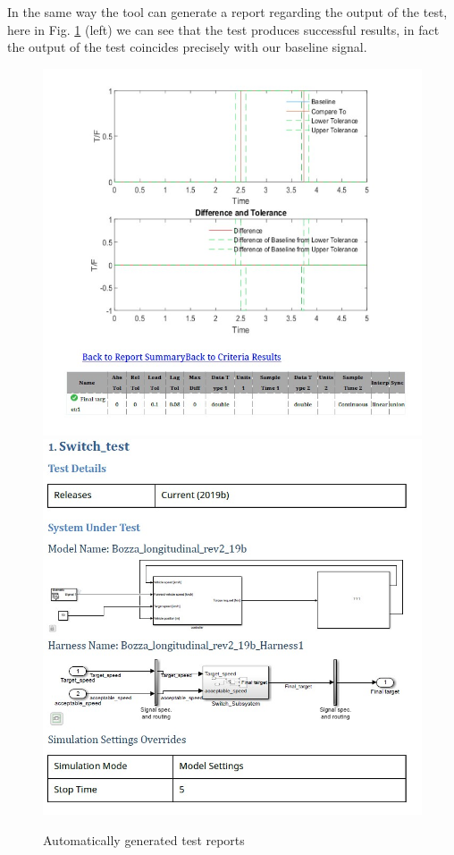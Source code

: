 \documentclass[12pt,a4paper]{report}
\begin{document}
In the same way the tool can generate a report regarding the output of the test, here in Fig. \ref{switch_baseline} (left) we can see that the test produces successful results, in fact the output of the test coincides precisely with our baseline signal. 
\begin{figure}[!h]
	\centering
	\includegraphics[scale=0.4]{switch_baseline.jpg}
	\includegraphics[scale=0.4]{switch_tes_spec.jpg}
	\caption{Automatically generated test reports}
	\label{switch_baseline}
\end{figure}
\FloatBarrier
\end{document}
